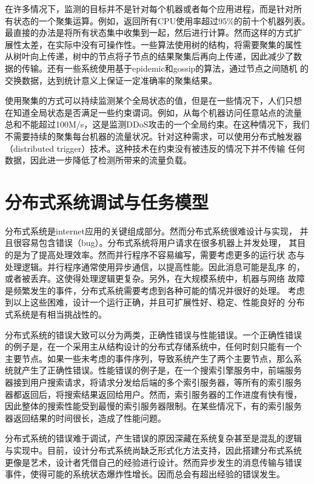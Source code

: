 在许多情况下，监测的目标并不是针对每个机器或者每个应用进程，而是针对所
有状态的一个聚集运算。例如，返回所有CPU使用率超过95\%的前十个机器列表。
最直接的办法是将所有状态集中收集到一起，然后进行计算。然而这样的方式扩
展性太差，在实际中没有可操作性。一些算法使用树的结构，将需要聚集的属性
从树叶向上传递，树中的节点将子节点的结果聚集后再向上传递，因此减少了数
据的传输。还有一些系统使用基于epidemic和gossip的算法，通过节点之间随机
的交换数据，达到统计意义上保证一定准确率的聚集结果。

使用聚集的方式可以持续监测某个全局状态的值，但是在一些情况下，人们只想
在知道全局状态是否满足一些约束谓词。例如，从每个机器访问任意站点的流量
总和不能超过100M/s，这是监测DDoS攻击的一个全局约束。在这种情况下，我们
不需要持续的聚集每台机器的流量状况。针对这种需求，可以使用分布式触发器
（distributed trigger）技术。这种技术在约束没有被违反的情况下并不传输
任何数据，因此进一步降低了检测所带来的流量负载。

\section{分布式系统调试与任务模型}

分布式系统是internet应用的关键组成部分。然而分布式系统很难设计与实现，
并且很容易包含错误（bug）。分布式系统将用户请求在很多机器上并发处理，
其目的是为了提高处理效率。然而并行程序不容易编写，需要考虑更多的运行状
态与处理逻辑。并行程序通常使用异步通信，以提高性能。因此消息可能是乱序
的，或者被丢弃。这使得处理逻辑更复杂。另外，在大规模系统中，机器与网络
故障是频繁发生的事件，分布式系统需要考虑到各种可能的情况并很好的处理。
考虑到以上这些困难，设计一个运行正确，并且可扩展性好、稳定、性能良好的
分布式系统是有相当挑战性的。

分布式系统的错误大致可以分为两类，正确性错误与性能错误。一个正确性错误
的例子是，在一个采用主从结构设计的分布式存储系统中，任何时刻只能有一个
主要节点。如果一些未考虑的事件序列，导致系统产生了两个主要节点，那么系
统就产生了正确性错误。性能错误的例子是，在一个搜索引擎服务中，前端服务
器接到用户搜索请求，将请求分发给后端的多个索引服务器，等所有的索引服务
器都返回后，将搜索结果返回给用户。然而，索引服务器的工作进度有快有慢，
因此整体的搜索性能受到最慢的索引服务器限制。在某些情况下，有的索引服务
器返回结果的时间很长，造成了性能问题。

分布式系统的错误难于调试，产生错误的原因深藏在系统复杂甚至是混乱的逻辑
与实现中。目前，设计分布式系统尚缺乏形式化方法支持，因此搭建分布式系统
更像是艺术，设计者凭借自己的经验进行设计。然而异步发生的消息传输与错误
事件，使得可能的系统状态爆炸性增长。因而总会有超出经验的错误发生。


